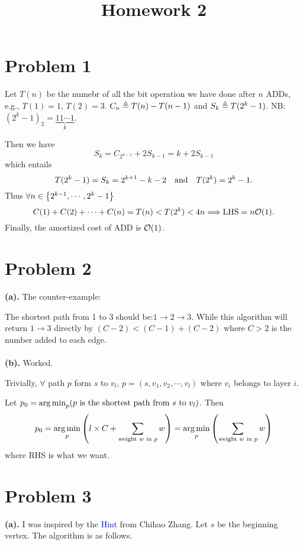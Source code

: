 \documentclass{article}
\begin{document}
\title{Homework 2}
\maketitle
\section*{Problem 1}
Let $T(n)$ be the numebr of all the bit operation we have done after  $n$ ADDs, e.g., $T(1)=1,\,T(2)=3$. $C_n\triangleq T(n)-T(n-1)$ and $S_k\triangleq T(2^k-1)$.
NB: $(2^k-1)_2=\underbrace{11\cdots1}_k$.

Then we have
\[
	S_k=C_{2^{k-1}}+2S_{k-1}=k+2S_{k-1}
\] which entails
\[
	T(2^k-1)=S_k=2^{k+1}-k-2\qand T(2^k)=2^k-1
	.\]
Thus $\forall n\in\qty{2^{k-1},\cdots,2^{k}-1}$
\[
	C(1)+C(2)+\cdots+C(n)=T(n)<T(2^k)<4n\Longrightarrow \mathrm{LHS}=n\mathcal{O}(1)
	.\]
Finally, the amortized cost of ADD is $\mathcal{O}(1)$.

\section*{Problem 2}
\textbf{(a).}
The counter-example:
\begin{figure}[H]
	\centering
\end{figure}
The shortest path from 1 to 3 should be:$1\to2\to3$. While this algorithm will return $1\to3$ directly by $(C-2)<(C-1)+(C-2)$ where $C>2$ is the number added to each edge.
\\\\
\textbf{(b).} Worked.

Trivially, $\forall$ path $p$ form $s$ to $v_l$, $p=(s,v_1,v_2,\cdots,v_l)$ where $v_i$ belongs to layer $i$.

Let $p_0=\mathop{\arg\min}_p(p \text{ is the shortest path from $s$ to $v_l$})$. Then
\[
	p_0=\mathop{\arg\min}_p\qty(l\times C+\sum_{\text{weight $w$ in }p} w)=\mathop{\arg\min}_p\qty(\sum_{\text{weight $w$ in }p} w)
\]
where RHS is what we want.

\section*{Problem 3}
\textbf{(a).}
I was inspired by the \textcolor{blue}{Hint} from Chihao Zhang. Let $s$ be the beginning vertex. The algorithm is as follows.
\end{document}
